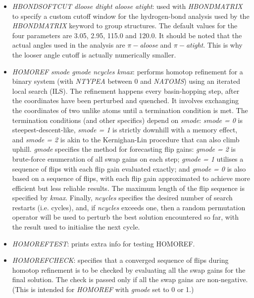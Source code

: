 \documentclass[12pt,a4paper,dvips]{article}
\begin{document}
\begin{itemize}
\item{\it HBONDSOFTCUT dloose dtight aloose atight\/}: used with {\it HBONDMATRIX} to specify a custom cutoff window for the
hydrogen-bond analysis used by the {\it HBONDMATRIX} keyword to group structures. The default values for the four parameters are 
3.05, 2.95, 115.0 and 120.0. It should be noted that the actual angles used in the analysis are $\pi-${\it aloose} and 
$\pi-${\it atight}. This is why the looser angle cutoff is actually numerically smaller. 

\item{\it HOMOREF smode gmode ncycles kmax\/}: performs homotop refinement for a binary system (with {\it NTYPEA\/} between 0 and {\it NATOMS\/}) using an iterated local search (ILS). The refinement happens every basin-hopping step, after the coordinates have been perturbed and quenched. It involves exchanging the coordinates of two unlike atoms until a termination condition is met. The termination conditions (and other specifics) depend on {\it smode\/}: {\it smode = 0\/} is steepest-descent-like, {\it smode = 1\/} is strictly downhill with a memory effect, and {\it smode = 2\/} is akin to the Kernighan-Lin procedure that can also climb uphill. {\it gmode\/} specifies the method for forecasting flip gains: {\it gmode = 2 \/} is brute-force enumeration of all swap gains on each step; {\it gmode = 1 \/} utilises a sequence of flips with each flip gain evaluated exactly; and {\it gmode = 0\/} is also based on a sequence of flips, with each flip gain approximated to achieve more efficient but less reliable results. The maximum length of the flip sequence is specified by {\it kmax}. Finally, {\it ncycles\/} specifies the desired number of search restarts (i.e. cycles), and, if {\it ncycles\/} exceeds one, then a random permutation operator will be used to perturb the best solution encountered so far, with the result used to initialise the next cycle.

\item{\it HOMOREFTEST\/}: prints extra info for testing HOMOREF.

\item{\it HOMOREFCHECK\/}: specifies that a converged sequence of flips during homotop refinement is to be checked by evaluating all the swap gains for the final solution. The check is passed only if all the swap gains are non-negative. (This is intended for {\it HOMOREF} with {\it gmode} set to 0 or 1.)


\end{itemize}
\end{document}
